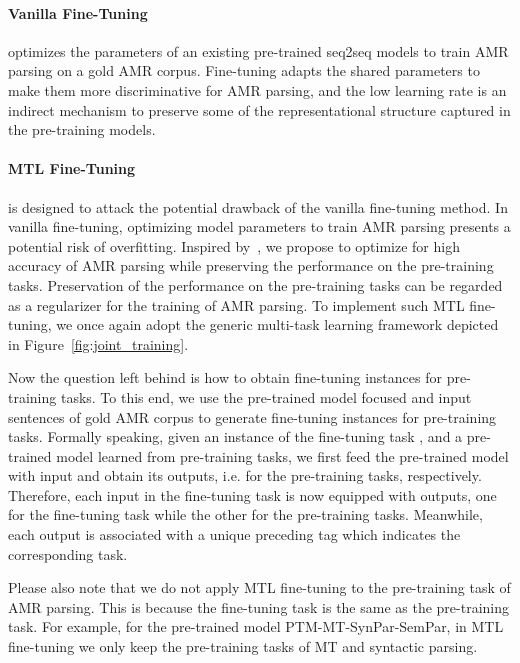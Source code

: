 \documentclass[11pt,a4paper]{article}
\begin{document}
\paragraph{Vanilla Fine-Tuning} optimizes the parameters of an existing pre-trained seq2seq models to train AMR parsing on a gold AMR corpus. Fine-tuning adapts the shared parameters to make them more discriminative for AMR parsing, and the low learning rate is an indirect mechanism to preserve some of the representational structure captured in the pre-training models. 

\paragraph{MTL Fine-Tuning} is designed to attack the potential drawback of the vanilla fine-tuning method. In vanilla fine-tuning, optimizing model parameters to train AMR parsing presents a potential risk of overfitting. Inspired by~\citet{li_hoiem_pami_2018}, we propose to optimize for high accuracy of AMR parsing while preserving the performance on the pre-training tasks. Preservation of the performance on the pre-training tasks can be regarded as a regularizer for the training of AMR parsing. To implement such MTL fine-tuning, we once again adopt the generic multi-task learning framework depicted in Figure~\ref{fig:joint_training}. 

Now the question left behind is how to obtain fine-tuning instances for pre-training tasks.  To this end, we use the pre-trained model focused and input sentences of gold AMR corpus to generate fine-tuning instances for pre-training tasks. Formally speaking, given an instance  of the fine-tuning task , and a pre-trained model learned from  pre-training tasks, we first feed the pre-trained model with input  and obtain its  outputs, i.e.  for the  pre-training tasks, respectively. Therefore, each input  in the fine-tuning task is now equipped with  outputs, one for the fine-tuning task while the other  for the  pre-training tasks. Meanwhile, each output is associated with a unique preceding tag which indicates the corresponding task.

Please also note that we do not apply MTL fine-tuning to the pre-training task of AMR parsing. This is because the fine-tuning task is the same as the pre-training task. For example, for the pre-trained model PTM-MT-SynPar-SemPar, in MTL fine-tuning we only keep the pre-training tasks of MT and syntactic parsing.
\end{document}
